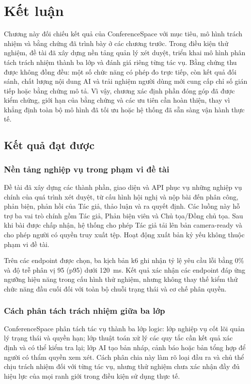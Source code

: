 \chapter{Kết luận}
\label{Chapter5}

Chương này đối chiếu kết quả của ConferenceSpace với mục tiêu, mô hình trách nhiệm và bằng chứng đã trình bày ở các chương trước. Trong điều kiện thử nghiệm, đề tài đã xây dựng nền tảng quản lý xét duyệt, triển khai mô hình phân tách trách nhiệm thành ba lớp và đánh giá riêng từng tác vụ. Bằng chứng thu được không đồng đều: một số chức năng có phép đo trực tiếp, còn kết quả đối sánh, chất lượng nội dung AI và trải nghiệm người dùng mới cung cấp chỉ số gián tiếp hoặc bằng chứng mô tả. Vì vậy, chương xác định phần đóng góp đã được kiểm chứng, giới hạn của bằng chứng và các ưu tiên cần hoàn thiện, thay vì khẳng định toàn bộ mô hình đã tối ưu hoặc hệ thống đã sẵn sàng vận hành thực tế.

\section{Kết quả đạt được}

\subsection{Nền tảng nghiệp vụ trong phạm vi đề tài}

Đề tài đã xây dựng các thành phần, giao diện và API phục vụ những nghiệp vụ chính của quá trình xét duyệt, từ cấu hình hội nghị và nộp bài đến phân công, phản biện, phản hồi của Tác giả, thảo luận và ra quyết định. Các luồng này hỗ trợ ba vai trò chính gồm Tác giả, Phản biện viên và Chủ tọa/Đồng chủ tọa. Sau khi bài được chấp nhận, hệ thống cho phép Tác giả tải lên bản camera-ready và cho phép người có quyền truy xuất tệp. Hoạt động xuất bản kỷ yếu không thuộc phạm vi đề tài.

Trên các endpoint được chọn, ba kịch bản k6 ghi nhận tỷ lệ yêu cầu lỗi bằng 0\% và độ trễ phân vị 95 (p95) dưới 120~ms. Kết quả xác nhận các endpoint đáp ứng ngưỡng hiệu năng trong cấu hình thử nghiệm, nhưng không thay thế kiểm thử chức năng đầu cuối đối với toàn bộ chuỗi trạng thái và cơ chế phân quyền.

\subsection{Cách phân tách trách nhiệm giữa ba lớp}

ConferenceSpace phân tách tác vụ thành ba lớp logic: lớp nghiệp vụ cốt lõi quản lý trạng thái và quyền hạn; lớp thuật toán xử lý các quy tắc cần kết quả xác định và có thể kiểm tra lại; lớp AI tạo bản nháp, cảnh báo hoặc bản tổng hợp để người có thẩm quyền xem xét. Cách phân chia này làm rõ loại đầu ra và chủ thể chịu trách nhiệm đối với từng tác vụ, nhưng thử nghiệm chưa xác nhận đầy đủ hiệu lực của mọi ranh giới trong điều kiện sử dụng thực tế.

